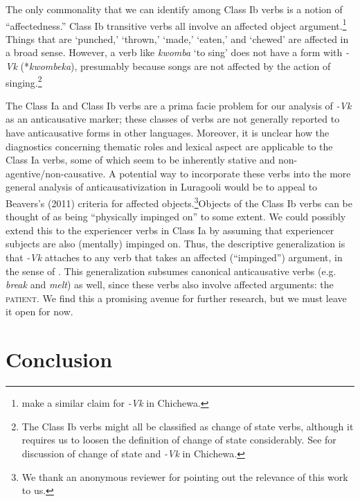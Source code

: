 \documentclass[output=paper]{langsci/lanmgscibook}
\begin{document}
The only commonality that we can identify among Class Ib verbs is a notion of “affectedness.” Class Ib transitive verbs all involve an affected object argument.\footnote{\citet{Dubinsky1996} make a similar claim for \textit{-Vk} in Chichewa.} Things that are ‘punched,’ ‘thrown,’ ‘made,’ ‘eaten,’ and ‘chewed’ are affected in a broad sense. However, a verb like \textit{kwomba} ‘to sing’ does not have a form with \textit{-Vk} (*\textit{kwombeka}), presumably because songs are not affected by the action of singing.\footnote{The Class Ib verbs might all be classified as change of state verbs, although it requires us to loosen the definition of change of state considerably. See \citet{Dubinsky1996} for discussion of change of state and \textit{-Vk} in Chichewa.}

The Class Ia and Class Ib verbs are a prima facie problem for our analysis of \textit{-Vk} as an anticausative marker; these classes of verbs are not generally reported to have anticausative forms in other languages. Moreover, it is unclear how the diagnostics concerning thematic roles and lexical aspect are applicable to the Class Ia verbs, some of which seem to be inherently stative and non-agentive/non-causative. A potential way to incorporate these verbs into the more general analysis of anticausativization in Luragooli would be to appeal to Beavers’s (2011) criteria for affected objects.\footnote{We thank an anonymous reviewer for pointing out the relevance of this work to us.}Objects of the Class Ib verbs can be thought of as being “physically impinged on” to some extent. We could possibly extend this to the experiencer verbs in Class Ia by assuming that experiencer subjects are also (mentally) impinged on. Thus, the descriptive generalization is that  \textit{-Vk} attaches to any verb that takes an affected (“impinged”) argument, in the sense of \citet{Beavers2011}. This generalization subsumes canonical anticausative verbs (e.g. \textit{break} and \textit{melt}) as well, since these verbs also involve affected arguments: the \textsc{patient}. We find this a promising avenue for further research, but we must leave it open for now.

\section{Conclusion}\label{sec:gluckman:6}
\end{document}
